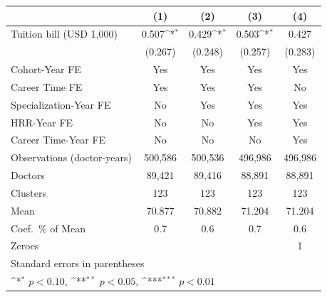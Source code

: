 {
\def\sym#1{\ifmmode^{#1}\else\(^{#1}\)\fi}
\begin{tabular}{l*{4}{c}}
\hline\hline
                    &\multicolumn{1}{c}{(1)}         &\multicolumn{1}{c}{(2)}         &\multicolumn{1}{c}{(3)}         &\multicolumn{1}{c}{(4)}         \\
\hline
Tuition bill (USD 1,000)&       0.507\sym{*}  &       0.429\sym{*}  &       0.503\sym{*}  &       0.427         \\
                    &     (0.267)         &     (0.248)         &     (0.257)         &     (0.283)         \\
[1em]
Cohort-Year FE      &         Yes         &         Yes         &         Yes         &         Yes         \\
[1em]
Career Time FE      &         Yes         &         Yes         &         Yes         &          No         \\
[1em]
Specialization-Year FE&          No         &         Yes         &         Yes         &         Yes         \\
[1em]
HRR-Year FE         &          No         &          No         &         Yes         &         Yes         \\
[1em]
Career Time-Year FE &          No         &          No         &          No         &         Yes         \\
\hline
Observations (doctor-years)&     500,586         &     500,536         &     496,986         &     496,986         \\
Doctors             &      89,421         &      89,416         &      88,891         &      88,891         \\
Clusters            &         123         &         123         &         123         &         123         \\
Mean                &      70.877         &      70.882         &      71.204         &      71.204         \\
Coef.\ \% of Mean   &         0.7         &         0.6         &         0.7         &         0.6         \\
Zeroes              &                     &                     &                     &           1         \\
\hline\hline
\multicolumn{5}{l}{\footnotesize Standard errors in parentheses}\\
\multicolumn{5}{l}{\footnotesize \sym{*} \(p<0.10\), \sym{**} \(p<0.05\), \sym{***} \(p<0.01\)}\\
\end{tabular}
}
